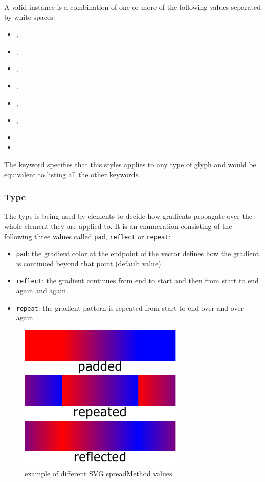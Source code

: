 A valid \StyleType instance is a combination of one or more of the following 
values separated by white spaces:

\begin{itemize}
 \item {},
 \item {},
 \item {}, 
 \item {},
 \item {}, 
 \item {}, 
 \item {} 
 \item {}
\end{itemize}

The  keyword specifies that this styles applies to any type of glyph and 
would be equivalent to listing all the other keywords. 

\subsubsection{Type \fixttspace{}}

The type \GradientSpreadMethod is being used by \GradientBase elements to decide how 
gradients propagate over the whole element they are applied to. It is an enumeration consisting 
of the following three values called \texttt{pad}, \texttt{reflect} or \texttt{repeat}:

\begin{itemize}
 \item {\texttt{pad}:} the gradient color at the
endpoint of the vector defines how the gradient is continued beyond that point (default value).
 \item {\texttt{reflect}:} the gradient continues from end to start and
then from start to end again and again.
 \item {\texttt{repeat}:} the gradient pattern is repeated from start to end over and over again.
\end{itemize}

\begin{figure}[!h]
\begin{center}
\includegraphics{figures/SVG_spreadMethod.pdf}
\end{center}
\caption{example of different SVG spreadMethod values}
\label{SVG:spreadMethod}
\end{figure}

